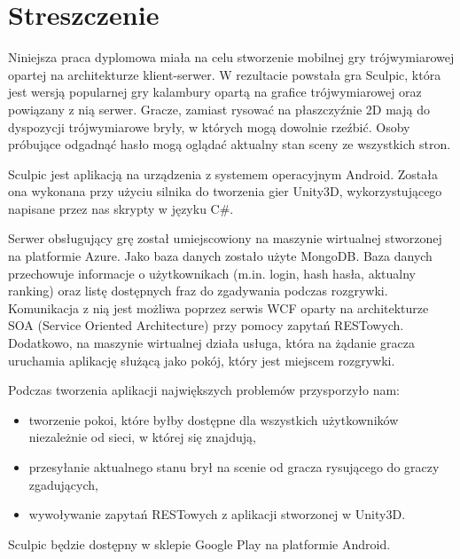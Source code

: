 \chapter*{Streszczenie}

Niniejsza praca dyplomowa miała na celu stworzenie mobilnej gry trójwymiarowej opartej na architekturze klient-serwer. W rezultacie powstała gra Sculpic, która jest wersją popularnej gry kalambury opartą na grafice trójwymiarowej oraz powiązany z nią serwer. Gracze, zamiast rysować na płaszczyźnie 2D mają do dyspozycji trójwymiarowe bryły, w których mogą dowolnie rzeźbić. Osoby próbujące odgadnąć hasło mogą oglądać aktualny stan sceny ze wszystkich stron.


Sculpic jest aplikacją na urządzenia z systemem operacyjnym Android. Została ona wykonana przy użyciu silnika do tworzenia gier Unity3D, wykorzystującego napisane przez nas skrypty w języku C\#.


Serwer obsługujący grę został umiejscowiony na maszynie wirtualnej stworzonej na platformie Azure. Jako baza danych zostało użyte MongoDB. Baza danych przechowuje informacje o użytkownikach (m.in. login, hash hasła, aktualny ranking) oraz listę dostępnych fraz do zgadywania podczas rozgrywki. Komunikacja z nią jest możliwa poprzez serwis WCF oparty na architekturze SOA (Service Oriented Architecture) przy pomocy zapytań RESTowych. Dodatkowo, na maszynie wirtualnej działa usługa, która na żądanie gracza uruchamia aplikację służącą jako pokój, który jest miejscem rozgrywki.


Podczas tworzenia aplikacji największych problemów przysporzyło nam:
\begin{itemize}
\item tworzenie pokoi, które byłby dostępne dla wszystkich użytkowników niezależnie od sieci, w której się znajdują,
\item przesyłanie aktualnego stanu brył na scenie od gracza rysującego do graczy zgadujących,
\item wywoływanie zapytań RESTowych z aplikacji stworzonej w Unity3D.
\end{itemize}

Sculpic będzie dostępny w sklepie Google Play na platformie Android.